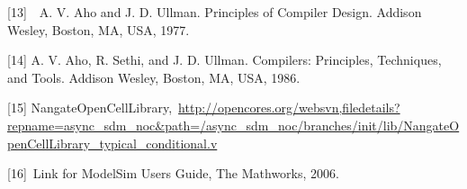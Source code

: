 \documentclass[a4paper]{article}
\begin{document}
\bigskip

{\color[rgb]{0.0,0.0,0.039215688}
[13]\ \textcolor[rgb]{0.13333334,0.13333334,0.13333334}{\ A. V. Aho and
J. D. Ullman. Principles of Compiler Design. Addison Wesley, Boston,
MA, USA, 1977.}}

{\color[rgb]{0.0,0.0,0.039215688}
\newline
\textcolor[rgb]{0.13333334,0.13333334,0.13333334}{[14] A. V. Aho, R.
Sethi, and J. D. Ullman. Compilers: Principles, Techniques, and Tools.
Addison Wesley, Boston, MA, USA, 1986.}}


\bigskip

{\color[rgb]{0.0,0.0,0.039215688}
\textcolor[rgb]{0.13333334,0.13333334,0.13333334}{[15]
NangateOpenCellLibrary,\ }\url{http://opencores.org/websvn,filedetails?repname=async_sdm_noc&path=/async_sdm_noc/branches/init/lib/NangateOpenCellLibrary_typical_conditional.v}}


\bigskip

{\color[rgb]{0.0,0.0,0.039215688}
[16]\ \textcolor[rgb]{0.13333334,0.13333334,0.13333334}{Link for
ModelSim User{\textquotesingle}s Guide, The Mathworks, 2006.}}


\bigskip


\bigskip


\bigskip


\bigskip


\bigskip


\bigskip


\bigskip


\bigskip


\bigskip


\bigskip


\bigskip


\bigskip


\bigskip


\bigskip


\bigskip


\bigskip


\bigskip


\bigskip


\bigskip


\bigskip


\bigskip


\bigskip
\end{document}
